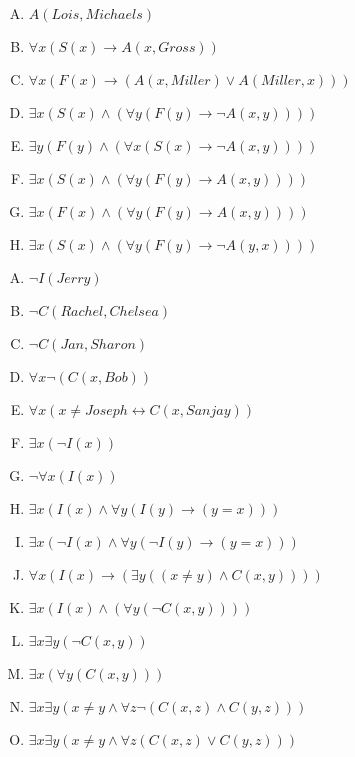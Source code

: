{{        %
        \begin{practices}
            \begin{enumerate}[A.]
                \item $A(Lois, Michaels)$
                \item $\forall x (S(x) \rightarrow A(x, Gross))$
                \item $\forall x (F(x) \rightarrow (A(x, Miller) \vee A(Miller, x)))$
                \item $\exists x (S(x) \wedge (\forall y (F(y) \rightarrow \neg A(x, y))))$
                \item $\exists y (F(y) \wedge (\forall x (S(x) \rightarrow \neg A(x, y))))$
                \item $\exists x (S(x) \wedge (\forall y (F(y) \rightarrow A(x, y))))$
                \item $\exists x (F(x) \wedge (\forall y (F(y) \rightarrow A(x, y))))$
                \item $\exists x (S(x) \wedge (\forall y (F(y) \rightarrow \neg A(y, x))))$
            \end{enumerate}
        \end{practices}

        \begin{practices}
            \begin{enumerate}[A.]
                \item $\neg I(Jerry)$
                \item $\neg C(Rachel, Chelsea)$
                \item $\neg C(Jan, Sharon)$
                \item $\forall x \neg (C(x, Bob))$
                \item $\forall x (x \neq Joseph \leftrightarrow C(x, Sanjay))$
                \item $\exists x (\neg I(x))$
                \item $\neg \forall x (I(x))$
                \item $\exists x (I(x) \wedge \forall y (I(y) \rightarrow (y = x)))$
                \item $\exists x (\neg I(x) \wedge \forall y (\neg I(y) \rightarrow (y = x)))$
                \item $\forall x (I(x) \rightarrow (\exists y ((x \neq y) \wedge C(x, y))))$
                \item $\exists x (I(x) \wedge (\forall y (\neg C(x, y))))$
                \item $\exists x \exists y (\neg C(x, y))$
                \item $\exists x (\forall y (C(x, y)))$
                \item $\exists x \exists y (x \neq y \wedge \forall z \neg (C(x, z) \wedge C(y, z)))$
                \item $\exists x \exists y (x \neq y \wedge \forall z (C(x, z) \vee C(y, z)))$
            \end{enumerate}
        \end{practices}

}}
